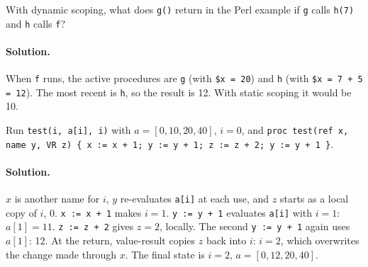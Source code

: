 \begin{exercise}
With dynamic scoping, what does \texttt{g()} return in the Perl example if
\texttt{g} calls \texttt{h(7)} and \texttt{h} calls \texttt{f}?
\end{exercise}

\paragraph{Solution.} When \texttt{f} runs, the active procedures are \texttt{g}
(with \texttt{\$x = 20}) and \texttt{h} (with \texttt{\$x = 7 + 5 = 12}). The most
recent is \texttt{h}, so the result is 12. With static scoping it would be 10.

\begin{exercise}
Run \texttt{test(i, a[i], i)} with $a = [0, 10, 20, 40]$, $i = 0$, and
\texttt{proc test(ref x, name y, VR z) \{ x := x + 1; y := y + 1; z := z + 2;
y := y + 1 \}}.
\end{exercise}

\paragraph{Solution.} $x$ is another name for $i$, $y$ re-evaluates \texttt{a[i]} at
each use, and $z$ starts as a local copy of $i$, 0. \texttt{x := x + 1} makes
$i = 1$. \texttt{y := y + 1} evaluates \texttt{a[i]} with $i = 1$: $a[1] = 11$.
\texttt{z := z + 2} gives $z = 2$, locally. The second \texttt{y := y + 1} again
uses $a[1]$: 12. At the return, value-result copies $z$ back into $i$: $i = 2$,
which overwrites the change made through $x$. The final state is $i = 2$,
$a = [0, 12, 20, 40]$.
